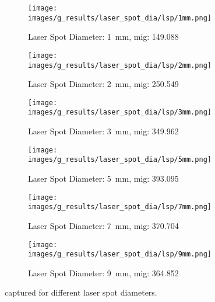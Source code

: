 \begin{figure}[h]
    \centering
    \begin{subfigure}[b]{0.4\textwidth}
        \centering
        \texttt{[image: images/g\_results/laser\_spot\_dia/lsp/1mm.png]}
        \caption{Laser Spot Diameter: \SI{1}{\milli\meter}, \gls{mig}: 149.088}
        \label{subfig:1mm.png}
    \end{subfigure}
    \hspace{1cm}
    \begin{subfigure}[b]{0.4\textwidth}
        \centering
        \texttt{[image: images/g\_results/laser\_spot\_dia/lsp/2mm.png]}
        \caption{Laser Spot Diameter: \SI{2}{\milli\meter}, \gls{mig}: 250.549}
        \label{subfig:2mm.png}
    \end{subfigure}

    \vspace{5mm}
    
    \begin{subfigure}[b]{0.4\textwidth}
        \centering
        \texttt{[image: images/g\_results/laser\_spot\_dia/lsp/3mm.png]}
        \caption{Laser Spot Diameter: \SI{3}{\milli\meter}, \gls{mig}: 349.962}
        \label{subfig:3mm.png}
    \end{subfigure}
    \hspace{1cm}
    \begin{subfigure}[b]{0.4\textwidth}
        \centering
        \texttt{[image: images/g\_results/laser\_spot\_dia/lsp/5mm.png]}
        \caption{Laser Spot Diameter: \SI{5}{\milli\meter}, \gls{mig}: 393.095}
        \label{subfig:5mm.png}
    \end{subfigure}

    \vspace{5mm}
    
    \begin{subfigure}[b]{0.4\textwidth}
        \centering
        \texttt{[image: images/g\_results/laser\_spot\_dia/lsp/7mm.png]}
        \caption{Laser Spot Diameter: \SI{7}{\milli\meter}, \gls{mig}: 370.704}
        \label{subfig:7mm.png}
    \end{subfigure}
    \hspace{1cm}
    \begin{subfigure}[b]{0.4\textwidth}
        \centering
        \texttt{[image: images/g\_results/laser\_spot\_dia/lsp/9mm.png]}
        \caption{Laser Spot Diameter: \SI{9}{\milli\meter}, \gls{mig}: 364.852}
        \label{subfig:9mm.png}
    \end{subfigure}
    \caption{ captured for different laser spot diameters.}
    \label{fig:laser_spot_dia_example_images}
\end{figure}